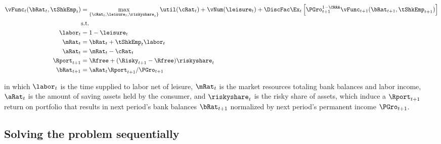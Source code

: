 \documentclass[\econtexRoot/EGMN]{subfiles}
\begin{document}
\begin{equation}
    \begin{split}
        \vFunc_{t}(\bRat_{t}, \tShkEmp_{t}) & = \max_{\{\cRat_{t},
            \leisure_{t}, \riskyshare_{t}\}} \util(\cRat_{t}) +
        \vNum(\leisure_{t}) +
        \DiscFac \Ex_{t} \left[ \PGro_{t+1}^{1-\CRRA}
            \vFunc_{t+1} (\bRat_{t+1},
            \tShkEmp_{t+1}) \right] \\
        & \text{s.t.} \\
        \labor_{t} & = 1 - \leisure_{t} \\
        \mRat_{t} & = \bRat_{t} + \tShkEmp_{t}\labor_{t} \\
        \aRat_{t} & = \mRat_{t} - \cRat_{t} \\
        \Rport_{t+1} & = \Rfree + (\Risky_{t+1} - \Rfree)
        \riskyshare_{t} \\
        \bRat_{t+1} & = \aRat_{t} \Rport_{t+1} / \PGro_{t+1}
    \end{split}
\end{equation}

in which $\labor_{t}$ is the time supplied to labor net of leisure, $\mRat_{t}$ is the market resources totaling bank balances and labor income, $\aRat_{t}$ is the amount of saving assets held by the consumer, and $\riskyshare_{t}$ is the risky share of assets, which induce a $\Rport_{t+1}$ return on portfolio that results in next period's bank balances $\bRat_{t+1}$ normalized by next period's permanent income $\PGro_{t+1}$.


\subsection{Solving the problem sequentially}
\end{document}
